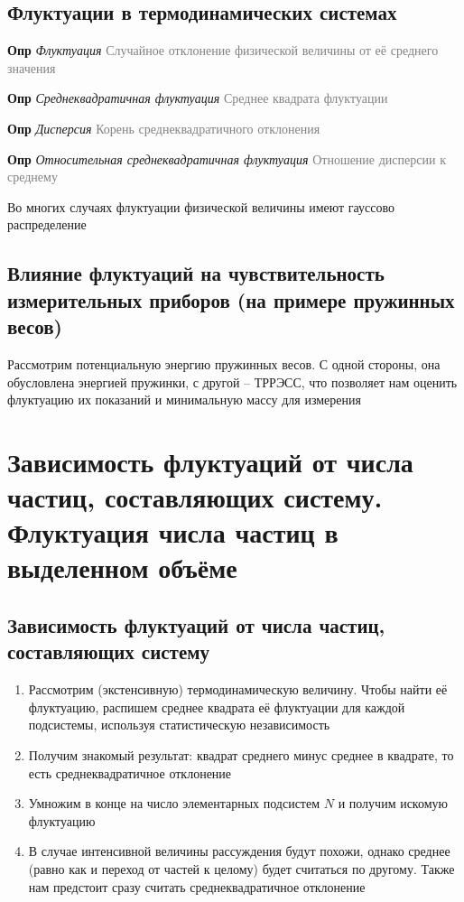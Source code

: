 \documentclass[a4paper, 14pt]{article}
\begin{document}
    \subsection{Флуктуации в термодинамических системах}
    
    \textbf{Опр} \textit{Флуктуация} \textcolor{gray}{Случайное отклонение физической величины от её среднего значения}
    
    \textbf{Опр} \textit{Среднеквадратичная флуктуация} \textcolor{gray}{Среднее квадрата флуктуации}
    
    \textbf{Опр} \textit{Дисперсия} \textcolor{gray}{Корень среднеквадратичного отклонения}
    
    \textbf{Опр} \textit{Относительная среднеквадратичная флуктуация} \textcolor{gray}{Отношение дисперсии к среднему}
    
    Во многих случаях флуктуации физической величины имеют гауссово распределение
    
    \subsection{Влияние флуктуаций на чувствительность измерительных приборов (на примере пружинных весов)}
    
    Рассмотрим потенциальную энергию пружинных весов.
    С одной стороны, она обусловлена энергией пружинки, с другой -- ТРРЭСС, что позволяет нам оценить флуктуацию
    их показаний и минимальную массу для измерения
    
    \section{Зависимость флуктуаций от числа частиц, составляющих систему.
    Флуктуация числа частиц в выделенном объёме}
    
    \subsection{Зависимость флуктуаций от числа частиц, составляющих систему}
    
    \begin{enumerate}
        \item Рассмотрим (экстенсивную) термодинамическую величину.
        Чтобы найти её флуктуацию, распишем среднее квадрата её флуктуации для каждой подсистемы, используя
        статистическую независимость
        \item Получим знакомый результат: квадрат среднего минус среднее в квадрате, то есть среднеквадратичное
        отклонение
        \item Умножим в конце на число элементарных подсистем $N$ и получим искомую флуктуацию
        \item В случае интенсивной величины рассуждения будут похожи, однако среднее (равно как и переход от частей
        к целому) будет считаться по другому.
        Также нам предстоит сразу считать среднеквадратичное отклонение
    \end{enumerate}
    
\end{document}

